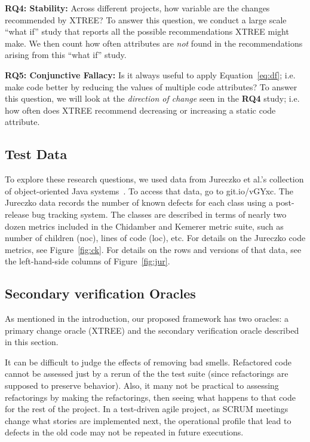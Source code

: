 \documentclass[twocolumn,5p]{elsarticle}
\newcommand{\fig}[1]{Figure~\ref{fig:#1}}
\newcommand{\eq}[1]{Equation~\ref{eq:#1}}
\theoremstyle{break}
\begin{document}
\begin{itemize}
{\bf RQ4: Stability:} Across different projects, how variable are the changes recommended by XTREE?   To answer this
question, we conduct a large scale ``what if'' study that reports all the possible recommendations XTREE might make.
We then count how often attributes are {\em not} found in the recommendations arising from this ``what if'' study.

{\bf RQ5: Conjunctive Fallacy:} Is  it  always  useful  to  apply \eq{df}; i.e.   make  code  better  by  reducing  the  values  of multiple code attributes? To answer this question, we will look at the {\em direction of change} seen in the {\bf RQ4} study; i.e.
how often does XTREE recommend decreasing or increasing a static code attribute.


 
  

\subsection{Test Data}\label{sect:tesd}

To explore these research questions,
we used data from
Jureczko et al.'s collection of object-oriented Java systems~\cite{jureczko10}. To access that data, go to   git.io/vGYxc.
The Jureczko data records the number of known defects for each class using a post-release bug tracking system. The classes are described in terms of nearly two dozen metrics included in the Chidamber and Kemerer metric suite, such as number of children (noc), lines of code (loc), etc. For details on the Jureczko code
metrics, see  \fig{ck}. For details on the rows and versions
of that data, see the left-hand-side columns of \fig{jur}.



 
\subsection{Secondary verification Oracles}
\label{sect:eval}

As mentioned in the introduction, our proposed framework has two oracles:
a primary change oracle (XTREE) and the secondary verification oracle described in this section.

It can be difficult  to judge the  effects of removing bad smells.
Refactored code cannot be assessed just by a rerun of the the test
suite (since refactorings are supposed to preserve behavior). 
Also, it many not be practical
 to assessing refactorings by making the
refactorings,  then seeing what happens to that code for the rest
of the project. In a test-driven agile project, as
SCRUM meetings change what stories are implemented next,
the operational profile that lead to defects in the old
code may not be repeated in future executions. 


\end{itemize}
\end{document}
